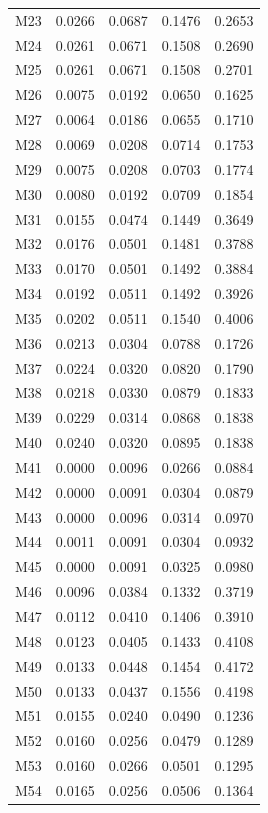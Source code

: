 \begin{longtable}{lrrrr}
M23 & 0.0266 & 0.0687 & 0.1476 & 0.2653 \\
M24 & 0.0261 & 0.0671 & 0.1508 & 0.2690 \\
M25 & 0.0261 & 0.0671 & 0.1508 & 0.2701 \\
M26 & 0.0075 & 0.0192 & 0.0650 & 0.1625 \\
M27 & 0.0064 & 0.0186 & 0.0655 & 0.1710 \\
M28 & 0.0069 & 0.0208 & 0.0714 & 0.1753 \\
M29 & 0.0075 & 0.0208 & 0.0703 & 0.1774 \\
M30 & 0.0080 & 0.0192 & 0.0709 & 0.1854 \\
M31 & 0.0155 & 0.0474 & 0.1449 & 0.3649 \\
M32 & 0.0176 & 0.0501 & 0.1481 & 0.3788 \\
M33 & 0.0170 & 0.0501 & 0.1492 & 0.3884 \\
M34 & 0.0192 & 0.0511 & 0.1492 & 0.3926 \\
M35 & 0.0202 & 0.0511 & 0.1540 & 0.4006 \\
M36 & 0.0213 & 0.0304 & 0.0788 & 0.1726 \\
M37 & 0.0224 & 0.0320 & 0.0820 & 0.1790 \\
M38 & 0.0218 & 0.0330 & 0.0879 & 0.1833 \\
M39 & 0.0229 & 0.0314 & 0.0868 & 0.1838 \\
M40 & 0.0240 & 0.0320 & 0.0895 & 0.1838 \\
M41 & 0.0000 & 0.0096 & 0.0266 & 0.0884 \\
M42 & 0.0000 & 0.0091 & 0.0304 & 0.0879 \\
M43 & 0.0000 & 0.0096 & 0.0314 & 0.0970 \\
M44 & 0.0011 & 0.0091 & 0.0304 & 0.0932 \\
M45 & 0.0000 & 0.0091 & 0.0325 & 0.0980 \\
M46 & 0.0096 & 0.0384 & 0.1332 & 0.3719 \\
M47 & 0.0112 & 0.0410 & 0.1406 & 0.3910 \\
M48 & 0.0123 & 0.0405 & 0.1433 & 0.4108 \\
M49 & 0.0133 & 0.0448 & 0.1454 & 0.4172 \\
M50 & 0.0133 & 0.0437 & 0.1556 & 0.4198 \\
M51 & 0.0155 & 0.0240 & 0.0490 & 0.1236 \\
M52 & 0.0160 & 0.0256 & 0.0479 & 0.1289 \\
M53 & 0.0160 & 0.0266 & 0.0501 & 0.1295 \\
M54 & 0.0165 & 0.0256 & 0.0506 & 0.1364 \\

\end{longtable}
